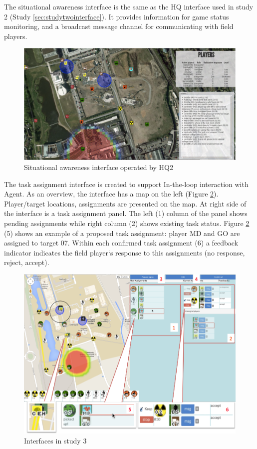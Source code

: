 The situational awareness interface is the same as the HQ interface used in study 2 (Study \ref{sec:studytwointerface}). It provides information for game status monitoring, and a broadcast message channel for communicating with field players.\\

\begin{figure}[h]
  \centering
  \includegraphics[width=1\textwidth]{img/study3/system/HQ2Interface}
  \caption{Situational awareness interface operated by HQ2}
  \label{fig:study3SAinterface}
\end{figure}

The task assignment interface is created to support In-the-loop interaction with Agent. As an overview, the interface has a map on the left (Figure \ref{fig:study3TAinterface}). Player/target locations, assignments are presented on the map. At right side of the interface is a task assignment panel. The left (1) column of the panel shows pending assignments while right column (2) shows existing task status. Figure  \ref{fig:study3TAinterface} (5) shows an example of a proposed task assignment: player MD and GO are assigned to target 07. Within each confirmed task assignment (6) a feedback indicator indicates the field player`s response to this assignments (no response, reject, accept).\\

\begin{figure}[h]
  \centering
  \includegraphics[width=1\textwidth]{img/study3/system/HQ1Interface}
  \caption{Interfaces in study 3}
  \label{fig:study3TAinterface}
\end{figure}

